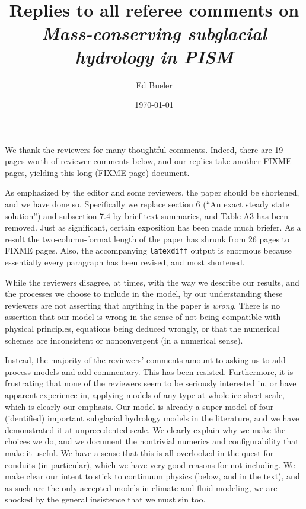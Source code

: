 \documentclass[11pt,reqno]{amsart}
\title[Replies to Referee Comments]{Replies to all referee comments on \\ \emph{Mass-conserving subglacial hydrology in PISM}}
\author{Ed Bueler}
\date{\today}
\begin{document}
\maketitle

\thispagestyle{empty}

We thank the reviewers for many thoughtful comments.  Indeed, there are 19 pages worth of reviewer comments below, and our replies take another FIXME pages, yielding this long (FIXME page) document.

As emphasized by the editor and some reviewers, the paper should be shortened, and we have done so.  Specifically we replace section 6 (``An exact steady state solution'') and subsection 7.4 by brief text summaries, and Table A3 has been removed.  Just as significant, certain exposition has been made much briefer.  As a result the two-column-format length of the paper has shrunk from 26 pages to FIXME pages.  Also, the accompanying \texttt{latexdiff} output is enormous because essentially every paragraph has been revised, and most shortened.

While the reviewers disagree, at times, with the way we describe our results, and the processes we choose to include in the model, by our understanding these reviewers are not asserting that anything in the paper is \emph{wrong}.  There is no assertion that our model is wrong in the sense of not being compatible with physical principles, equations being deduced wrongly, or that the numerical schemes are inconsistent or nonconvergent (in a numerical sense).

Instead, the majority of the reviewers' comments amount to asking us to add process models and add commentary.  This has been resisted.  Furthermore, it is frustrating that none of the reviewers seem to be seriously interested in, or have apparent experience in, applying models of any type at whole ice sheet scale, which is clearly our emphasis.  Our model is already a super-model of four (identified) important subglacial hydrology models in the literature, and we have demonstrated it at unprecedented scale.  We clearly explain why we make the choices we do, and we document the nontrivial numerics and configurability that make it useful.  We have a sense that this is all overlooked in the quest for conduits (in particular), which we have very good reasons for not including.  We make clear our intent to stick to continuum physics (below, and in the text), and as such are the only accepted models in climate and fluid modeling, we are shocked by the general insistence that we must sin too.
\end{document}

